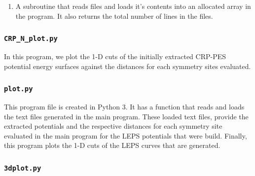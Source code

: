 \documentclass[12pt]{article}
\begin{document}
\begin{enumerate}
    \item A subroutine that reads files and loads it's contents into an allocated array in the program. It also returns the total number of lines in the files.
    \begin{table}[h!]\centering
    \caption{Subroutine 1 - read\_file}
    \end{table} 
\end{enumerate}

\subsubsection{\textbf{{\texttt{CRP\_N\_plot.py}}}}

In this program, we plot the 1-D cuts of the initially extracted CRP-PES potential energy surfaces against the distances for each symmetry sites evaluated. 

\subsubsection{\textbf{{\texttt{plot.py}}}}

This program file is created in Python 3. It has a function that reads and loads the text files generated in the main program. These loaded text files, provide the extracted potentials and the respective distances for each symmetry site evaluated in the main program for the LEPS potentials that were build. Finally, this program plots the 1-D cuts of the LEPS curves that are generated.

\subsubsection{\textbf{{\texttt{3dplot.py}}}}
\end{document}

